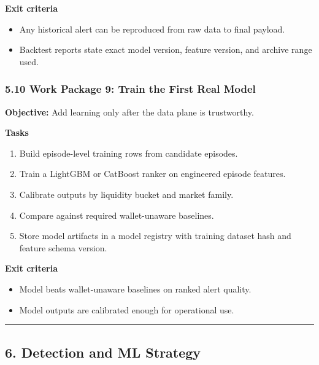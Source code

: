 \documentclass[
]{article}
\providecommand{\tightlist}{%
  \setlength{\itemsep}{0pt}\setlength{\parskip}{0pt}}
\begin{document}
\textbf{Exit criteria}

\begin{itemize}
\tightlist
\item
  Any historical alert can be reproduced from raw data to final payload.
\item
  Backtest reports state exact model version, feature version, and
  archive range used.
\end{itemize}

\subsubsection{5.10 Work Package 9: Train the First Real
Model}\label{510-work-package-9-train-the-first-real-model}

\textbf{Objective:} Add learning only after the data plane is
trustworthy.

\textbf{Tasks}

\begin{enumerate}
\def\labelenumi{\arabic{enumi}.}
\tightlist
\item
  Build episode-level training rows from candidate episodes.
\item
  Train a LightGBM or CatBoost ranker on engineered episode features.
\item
  Calibrate outputs by liquidity bucket and market family.
\item
  Compare against required wallet-unaware baselines.
\item
  Store model artifacts in a model registry with training dataset hash
  and feature schema version.
\end{enumerate}

\textbf{Exit criteria}

\begin{itemize}
\tightlist
\item
  Model beats wallet-unaware baselines on ranked alert quality.
\item
  Model outputs are calibrated enough for operational use.
\end{itemize}

\begin{center}\rule{0.5\linewidth}{0.5pt}\end{center}

\subsection{6. Detection and ML
Strategy}\label{6-detection-and-ml-strategy}
\end{document}
